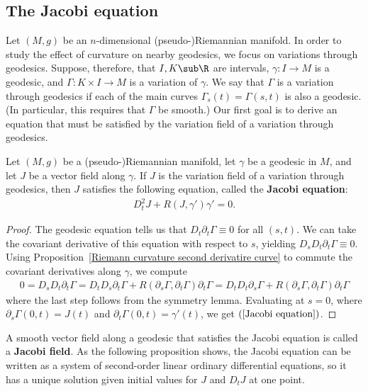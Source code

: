 \subsection{The Jacobi equation}
Let $(M,g)$ be an $n$-dimensional (pseudo-)Riemannian manifold. In order to study the effect of curvature on nearby geodesics, we focus on variations through geodesics. Suppose, therefore, that $I,K\sub\R$ are intervals, $\gamma:I\to M$ is a geodesic, and $\Gamma:K\times I\to M$ is a variation of $\gamma$. We say that $\Gamma$ is a variation through geodesics if each of the main curves $\Gamma_s(t)=\Gamma(s,t)$ is also a geodesic. (In particular, this requires that $\Gamma$ be smooth.) Our first goal is to derive an equation that must be satisfied by the variation field of a variation through geodesics.
\begin{theorem}\label{Jacobi equation}
Let $(M,g)$ be a (pseudo-)Riemannian manifold, let $\gamma$ be a geodesic in $M$, and let $J$ be a vector field along $\gamma$. If $J$ is the variation field of a variation through geodesics, then $J$ satisfies the following equation, called the \textbf{Jacobi equation}:
\begin{align}\label{Jacobi equation-1}
D_t^2J+R(J,\gamma')\gamma'=0.
\end{align}
\end{theorem}
\begin{proof}
The geodesic equation tells us that $D_t\partial_t\Gamma\equiv 0$ for all $(s,t)$. We can take the covariant derivative of this equation with respect to $s$, yielding $D_sD_t\partial_t\Gamma\equiv 0$. Using Proposition~\ref{Riemann curvature second derivatire curve} to commute the covariant derivatives along $\gamma$, we compute
\begin{align*}
0=D_sD_t\partial_t\Gamma=D_tD_s\partial_t\Gamma+R(\partial_s\Gamma,\partial_t\Gamma)\partial_t\Gamma=D_tD_t\partial_s\Gamma+R(\partial_s\Gamma,\partial_t\Gamma)\partial_t\Gamma
\end{align*}
where the last step follows from the symmetry lemma. Evaluating at $s=0$, where $\partial_s\Gamma(0,t)=J(t)$ and $\partial_t\Gamma(0,t)=\gamma'(t)$, we get $(\ref{Jacobi equation})$.
\end{proof}
A smooth vector field along a geodesic that satisfies the Jacobi equation is called a \textbf{Jacobi field}. As the following proposition shows, the Jacobi equation  can be written as a system of second-order linear ordinary differential equations, so it has a unique solution given initial values for $J$ and $D_tJ$ at one point.
